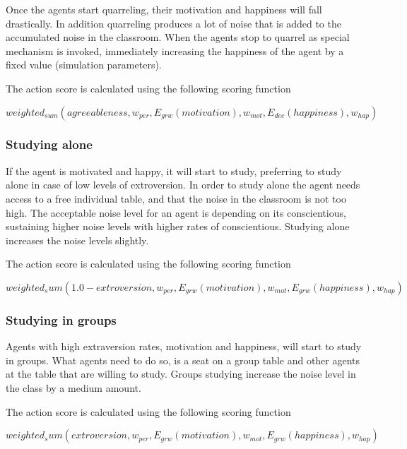 Once the agents start quarreling, their motivation and happiness will fall drastically.
In addition quarreling produces a lot of noise that is added to the accumulated
noise in the classroom.
When the agents stop to quarrel as special mechanism is invoked, immediately
increasing the happiness of the agent by a fixed value (simulation parameters).

The action score is calculated using the following scoring function

\begin{equation}
    weighted_{sum}(agreeableness, w_{per}, E_{grw}(motivation), w_{mot}, E_{dec}(happiness), w_{hap})
\end{equation}


\subsubsection{Studying alone}
If the agent is motivated and happy, it will start to study, preferring
to study alone in case of low levels of extroversion. In order to study alone the
agent needs access to a free individual table, and that the noise in the classroom
is not too high. The acceptable noise level for an agent is depending on its
conscientious, sustaining higher noise levels with higher rates of conscientious.
Studying alone increases the noise levels slightly.

The action score is calculated using the following scoring function

\begin{equation}
    weighted_sum(1.0 - extroversion, w_{per}, E_{grw}(motivation), w_{mot}, E_{grw}(happiness), w_{hap})
\end{equation}

\subsubsection{Studying in groups}
Agents with high extraversion rates, motivation and happiness, will start to study
in groups. What agents need to do so, is a seat on a group table and other agents
at the table that are willing to study. Groups studying increase the noise level
in the class by a medium amount.

The action score is calculated using the following scoring function

\begin{equation}
    weighted_sum(extroversion, w_{per}, E_{grw}(motivation), w_{mot}, E_{grw}(happiness), w_{hap})
\end{equation}
